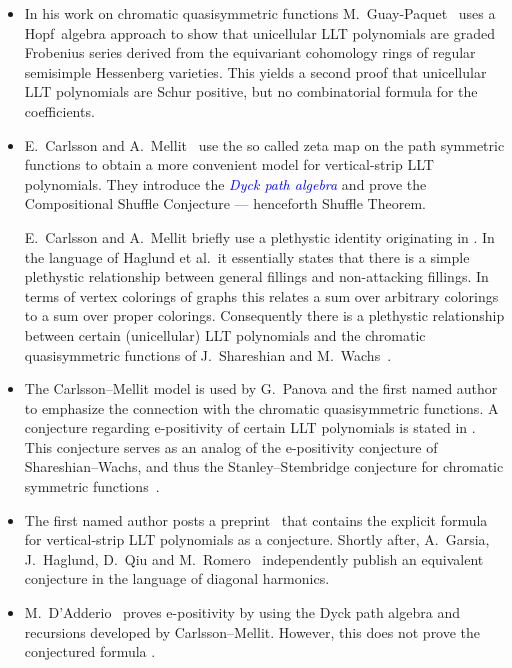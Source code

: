 \documentclass[reqno]{amsart}
\newcommand{\defin}[1]{\textcolor{blue}{\emph{#1}}}
\newcommand{\elementaryE}{\mathrm{e}}
\begin{document}
\begin{itemize}
 \item[(2016)] In his work on chromatic quasisymmetric 
 functions M.~Guay-Paquet~\cite{GuayPaquet2016x} uses a Hopf~algebra approach 
 to show that unicellular LLT polynomials are graded Frobenius series derived from the equivariant 
 cohomology rings of regular semisimple Hessenberg varieties.  This yields a second 
 proof that unicellular LLT polynomials are Schur positive, 
 but no combinatorial formula for the coefficients.
 
 \item[(2017)]  
 E.~Carlsson and A.~Mellit~\cite{CarlssonMellit2017}
 use the so called zeta map on the path symmetric functions to obtain a more convenient model for vertical-strip LLT polynomials.
 They introduce the \defin{Dyck path algebra} and prove the Compositional 
 Shuffle Conjecture --- henceforth Shuffle Theorem.
 
 E.~Carlsson and A.~Mellit briefly use a plethystic identity 
 originating in \cite{HaglundHaimanLoehr2005}. 
 In the language of Haglund et al.\ it essentially states that 
 there is a simple plethystic relationship between general 
 fillings and non-attacking fillings.
 In terms of vertex colorings of graphs this relates a sum over arbitrary colorings to a sum over proper colorings. 
 Consequently there is a plethystic relationship 
 between certain (unicellular) LLT polynomials and the chromatic quasisymmetric functions 
 of J.~Shareshian and M.~Wachs~\cite{ShareshianWachs2012,ShareshianWachs2016}. 
  
 \item[(2018)] The Carlsson--Mellit model is 
 used by G.~Panova and the first named author~\cite{AlexanderssonPanova2016}
 to emphasize the connection with the chromatic quasisymmetric functions.
 A conjecture regarding $\elementaryE$-positivity of certain LLT polynomials is stated in \cite[Conj.~4.5]{AlexanderssonPanova2016}.
 This conjecture serves as an analog of the $\elementaryE$-positivity conjecture of 
 Shareshian--Wachs, and thus the Stanley--Stembridge 
 conjecture for chromatic symmetric functions~\cite{Stanley1995,StanleyStembridge1993}.

 \item[(2019)] The first named author posts a preprint~\cite{Alexandersson2019llt} 
 that contains the explicit formula  for vertical-strip LLT polynomials as a conjecture.
 Shortly after, A.~Garsia, J.~Haglund, D.~Qiu and M.~Romero~\cite{GarsiaHaglundQiuRomero2019}
 independently publish an equivalent conjecture in the language of diagonal harmonics.

 \item[(2019)] M.~D'Adderio~\cite{DAdderio2020} proves $\elementaryE$-positivity 
 by using the Dyck path algebra and recursions developed by Carlsson--Mellit. 
 However, this does not prove the conjectured formula .
\end{itemize}
\end{document}
